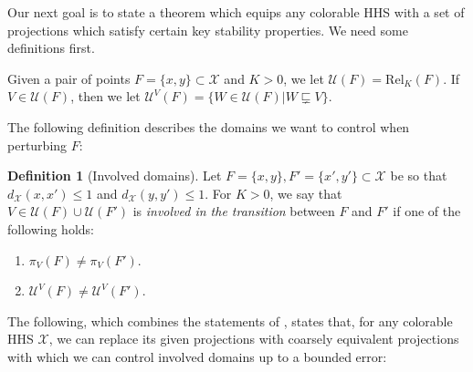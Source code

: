 \documentclass{amsart}
\theoremstyle{definition}
\newtheorem{definition}[theorem]{Definition}
\theoremstyle{remark}
\theoremstyle{definition}
\newcommand{\calU}{\mathcal{U}}
\newcommand{\calX}{\mathcal{X}}
\newcommand{\Rel}{\mathrm{Rel}}
\begin{document}
Our next goal is to state a theorem which equips any colorable HHS with a set of projections which satisfy certain key stability properties.  We need some definitions first.

Given a pair of points $F = \{x,y\} \subset \calX$ and $K>0$, we let $\calU(F) = \Rel_K(F)$.  If $V \in \calU(F)$, then we let $\calU^V(F) = \{W \in \calU(F) | W \sqsubsetneq V\}$.

The following definition \cite[Definition 2.13]{DMS_bary} describes the domains we want to control when perturbing $F$:

\begin{definition}[Involved domains]\label{defn:involved}
Let $F = \{x,y\}, F' = \{x', y'\} \subset \calX$ be so that $d_{\calX}(x,x') \leq 1 $ and $d_{\calX}(y,y') \leq 1$.  For $K>0$, we say that $V \in \calU(F) \cup \calU(F')$ is \emph{involved in the transition} between $F$ and $F'$ if one of the following holds:

\begin{enumerate}
\item $\pi_V(F) \neq \pi_V(F')$.
\item $\calU^V(F) \neq \calU^V(F')$.
\end{enumerate}
\end{definition}

The following, which combines the statements of \cite[Theorem 2.9 and Proposition 2.14]{DMS_bary}, states that, for any colorable HHS $\calX$, we can replace its given projections with coarsely equivalent projections with which we can control involved domains up to a bounded error:
\end{document}
